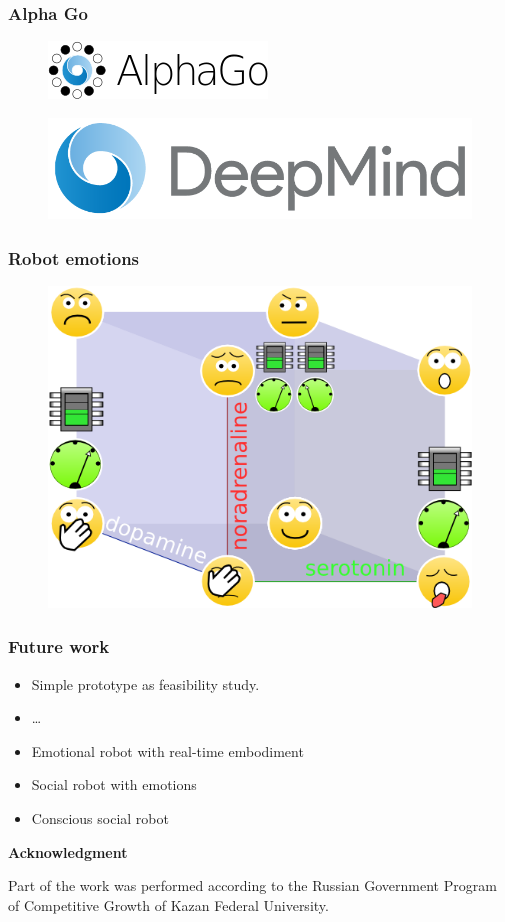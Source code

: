 \documentclass[12pt, aspectratio=169]{beamer}
\begin{document}
\begin{frame}
\frametitle{Alpha Go}
\begin{figure}
  \includegraphics[width=0.45\linewidth]{220px-Alphago.png}
\end{figure}
\begin{figure}
  \includegraphics[width=0.45\linewidth]{DeepMind_logo.png}
\end{figure}
\end{frame}

\begin{frame}
\frametitle{Robot emotions}
\begin{figure}
\includegraphics[width=0.7\linewidth]{cube_of_emotional_parameters_machine}
\end{figure}
\end{frame}



\begin{frame}
  \frametitle{Future work}
  
\begin{itemize}
  \item Simple prototype as feasibility study.
  \item \ldots\
  \item Emotional robot with real-time embodiment
  \item Social robot with emotions
  \item Conscious social robot
\end{itemize}

\textbf{Acknowledgment}

Part of the work was performed according to the Russian Government Program of Competitive Growth of Kazan Federal University.

\end{frame}



\end{document}

